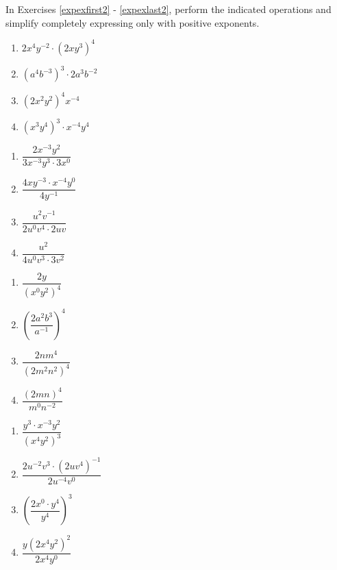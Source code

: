 In Exercises \ref{expexfirst2} - \ref{expexlast2}, perform the indicated operations and simplify completely expressing only with positive exponents.

\begin{multicols}{4}
\begin{enumerate}
\setcounter{enumi}{\value{HW}}

\item $2 x^4 y^{- 2} \cdot (2 x y^3)^4$ \label{expexfirst2}
\item $(a^4 b^{- 3})^3 \cdot 2 a^3 b^{- 2}$
\item $(2 x^2 y^2)^4 x^{- 4}$
\item $(x^3 y^4)^3 \cdot x^{- 4} y^4$

\setcounter{HW}{\value{enumi}}
\end{enumerate}
\end{multicols}
\begin{multicols}{4}
\begin{enumerate}
\setcounter{enumi}{\value{HW}}

\item $\dfrac{2 x^{- 3} y^2}{3 x^{- 3} y^3 \cdot 3 x^0}$
\item $\dfrac{4 x y^{- 3} \cdot x^{- 4} y^0}{4 y^{- 1}}$
\item $\dfrac{u^2 v^{- 1}}{2 u^0 v^4 \cdot 2 u v}$
\item $\dfrac{u^2}{4 u^0 v^3 \cdot 3 v^2}$

\setcounter{HW}{\value{enumi}}
\end{enumerate}
\end{multicols}
\begin{multicols}{4}
\begin{enumerate}
\setcounter{enumi}{\value{HW}}

\item $\dfrac{2 y}{(x^0 y^2)^4}$
\item $(\dfrac{2 a^2 b^3}{a^{- 1}})^4$
\item $\dfrac{2 n m^4}{(2 m^2 n^2)^4}$
\item $\dfrac{(2 m n)^4}{m^0 n^{- 2}}$

\setcounter{HW}{\value{enumi}}
\end{enumerate}
\end{multicols}
\begin{multicols}{4}
\begin{enumerate}
\setcounter{enumi}{\value{HW}}

\item $\dfrac{y^3 \cdot x^{- 3} y^2}{(x^4 y^2)^3}$
\item $\dfrac{2 u^{- 2} v^3 \cdot (2 u v^4)^{- 1}}{2 u^{- 4} v^0}$
\item $(\dfrac{2 x^0 \cdot y^4}{y^4})^3$
\item $\dfrac{y (2 x^4 y^2)^2}{2 x^4 y^0}$

\setcounter{HW}{\value{enumi}}
\end{enumerate}
\end{multicols}
